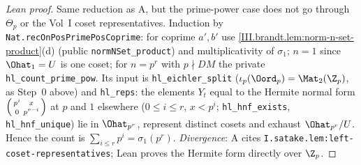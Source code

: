 \begin{proof}[Lean proof]
Same reduction as A, but the prime-power case does not go through $\Theta_p$ or the Vol~I coset representatives. Induction by \texttt{Nat.recOnPosPrimePosCoprime}: for coprime $a',b'$ use \cref{III.brandt.lem:norm-n-set-product}(d) (public \texttt{normNSet\_product}) and multiplicativity of $\sigma_1$; $n=1$ since $\Ohat_1=U$ is one coset; for $n=p^r$ with $p\nmid DM$ the private \texttt{hl\_count\_prime\_pow}. Its input is \texttt{hl\_eichler\_split} ($\iota_p(\Oord_p)=\Mat_2(\Z_p)$, as Step~0 above) and \texttt{hl\_reps}: the elements $Y_t$ equal to the Hermite normal form $\begin{psmallmatrix}p^i&x\\0&p^{r-i}\end{psmallmatrix}$ at $p$ and $1$ elsewhere ($0\le i\le r$, $x<p^i$; \texttt{hl\_hnf\_exists}, \texttt{hl\_hnf\_unique}) lie in $\Ohat_{p^r}$, represent distinct cosets and exhaust $\Ohat_{p^r}/U$. Hence the count is $\sum_{i\le r}p^i=\sigma_1(p^r)$. \emph{Divergence}: A cites \texttt{I.satake.lem:left-coset-representatives}; Lean proves the Hermite form directly over $\Z_p$.
\end{proof}

